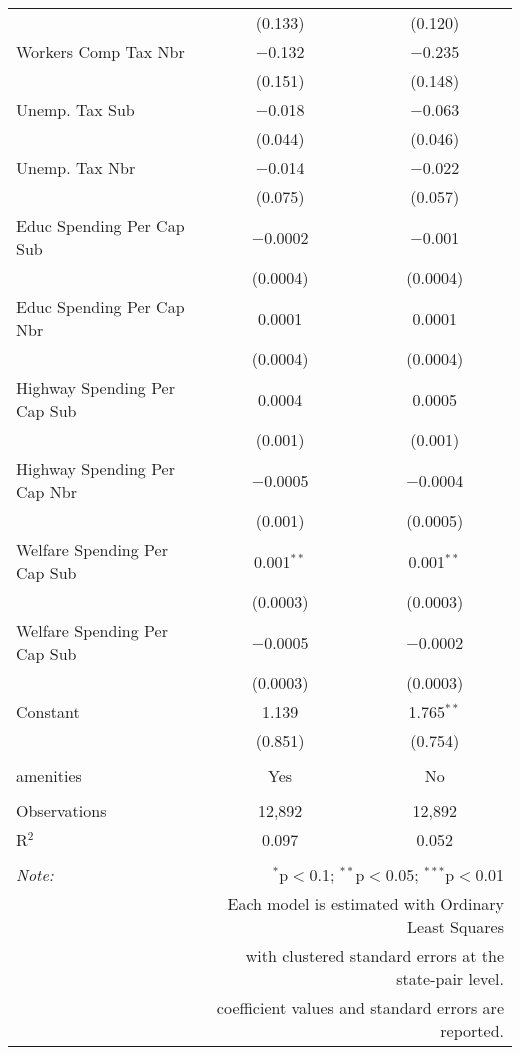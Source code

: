 \begin{table}[!htbp]
\begin{tabular}{@{\extracolsep{5pt}}lcc}
  & (0.133) & (0.120) \\ 
  Workers Comp Tax Nbr & $-$0.132 & $-$0.235 \\ 
  & (0.151) & (0.148) \\ 
  Unemp. Tax Sub & $-$0.018 & $-$0.063 \\ 
  & (0.044) & (0.046) \\ 
  Unemp. Tax Nbr & $-$0.014 & $-$0.022 \\ 
  & (0.075) & (0.057) \\ 
  Educ Spending Per Cap Sub & $-$0.0002 & $-$0.001 \\ 
  & (0.0004) & (0.0004) \\ 
  Educ Spending Per Cap Nbr & 0.0001 & 0.0001 \\ 
  & (0.0004) & (0.0004) \\ 
  Highway Spending Per Cap Sub & 0.0004 & 0.0005 \\ 
  & (0.001) & (0.001) \\ 
  Highway Spending Per Cap Nbr & $-$0.0005 & $-$0.0004 \\ 
  & (0.001) & (0.0005) \\ 
  Welfare Spending Per Cap Sub & 0.001$^{**}$ & 0.001$^{**}$ \\ 
  & (0.0003) & (0.0003) \\ 
  Welfare Spending Per Cap Sub & $-$0.0005 & $-$0.0002 \\ 
  & (0.0003) & (0.0003) \\ 
  Constant & 1.139 & 1.765$^{**}$ \\ 
  & (0.851) & (0.754) \\ 
 \hline \\[-1.8ex] 
amenities & Yes & No \\ 
\hline \\[-1.8ex] 
Observations & 12,892 & 12,892 \\ 
R$^{2}$ & 0.097 & 0.052 \\ 
\hline 
\hline \\[-1.8ex] 
\textit{Note:}  & \multicolumn{2}{r}{$^{*}$p$<$0.1; $^{**}$p$<$0.05; $^{***}$p$<$0.01} \\ 
 & \multicolumn{2}{r}{Each model is estimated with Ordinary Least Squares} \\ 
 & \multicolumn{2}{r}{with clustered standard errors at the state-pair level.} \\ 
 & \multicolumn{2}{r}{coefficient values and standard errors are reported.} \\ 
\end{tabular} 
\end{table} 
